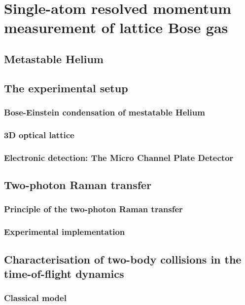 \chapter{Single-atom resolved momentum measurement of lattice Bose gas}

\section{Metastable Helium}

\section{The experimental setup}

\subsection{Bose-Einstein condensation of mestatable Helium}

\subsection{3D optical lattice}

\subsection{Electronic detection: The Micro Channel Plate Detector}

\section{Two-photon Raman transfer}

\subsection{Principle of the two-photon Raman transfer}

\subsection{Experimental implementation}

\section{Characterisation of two-body collisions in the time-of-flight dynamics}

\subsection{Classical model}

